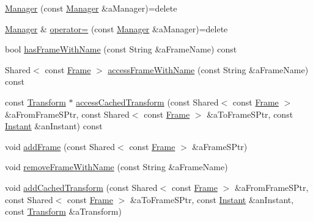 \begin{DoxyCompactItemize}
\item 
\hyperlink{classostk_1_1physics_1_1coord_1_1frame_1_1_manager_af000e1deebf0cf7f08ffa54d0e2aa854}{Manager} (const \hyperlink{classostk_1_1physics_1_1coord_1_1frame_1_1_manager}{Manager} \&a\+Manager)=delete
\item 
\hyperlink{classostk_1_1physics_1_1coord_1_1frame_1_1_manager}{Manager} \& \hyperlink{classostk_1_1physics_1_1coord_1_1frame_1_1_manager_a6503baa568803e9943a6685865269b6f}{operator=} (const \hyperlink{classostk_1_1physics_1_1coord_1_1frame_1_1_manager}{Manager} \&a\+Manager)=delete
\item 
bool \hyperlink{classostk_1_1physics_1_1coord_1_1frame_1_1_manager_ac353df7eaa41ec705c7728afef0aff34}{has\+Frame\+With\+Name} (const String \&a\+Frame\+Name) const
\item 
Shared$<$ const \hyperlink{classostk_1_1physics_1_1coord_1_1_frame}{Frame} $>$ \hyperlink{classostk_1_1physics_1_1coord_1_1frame_1_1_manager_abe8ac950d9f04b01a7c1165a6acb2a65}{access\+Frame\+With\+Name} (const String \&a\+Frame\+Name) const
\item 
const \hyperlink{classostk_1_1physics_1_1coord_1_1_transform}{Transform} $\ast$ \hyperlink{classostk_1_1physics_1_1coord_1_1frame_1_1_manager_a241b2aea6a86ba5a0ec50a0bf91b4427}{access\+Cached\+Transform} (const Shared$<$ const \hyperlink{classostk_1_1physics_1_1coord_1_1_frame}{Frame} $>$ \&a\+From\+Frame\+S\+Ptr, const Shared$<$ const \hyperlink{classostk_1_1physics_1_1coord_1_1_frame}{Frame} $>$ \&a\+To\+Frame\+S\+Ptr, const \hyperlink{classostk_1_1physics_1_1time_1_1_instant}{Instant} \&an\+Instant) const
\item 
void \hyperlink{classostk_1_1physics_1_1coord_1_1frame_1_1_manager_a75538bd860deefad7cce2347a6b96d97}{add\+Frame} (const Shared$<$ const \hyperlink{classostk_1_1physics_1_1coord_1_1_frame}{Frame} $>$ \&a\+Frame\+S\+Ptr)
\item 
void \hyperlink{classostk_1_1physics_1_1coord_1_1frame_1_1_manager_ada10a8a3ff3ced0182bbb2a42abbbb71}{remove\+Frame\+With\+Name} (const String \&a\+Frame\+Name)
\item 
void \hyperlink{classostk_1_1physics_1_1coord_1_1frame_1_1_manager_a0b6f34e9c38cc24982afc09b2b991c94}{add\+Cached\+Transform} (const Shared$<$ const \hyperlink{classostk_1_1physics_1_1coord_1_1_frame}{Frame} $>$ \&a\+From\+Frame\+S\+Ptr, const Shared$<$ const \hyperlink{classostk_1_1physics_1_1coord_1_1_frame}{Frame} $>$ \&a\+To\+Frame\+S\+Ptr, const \hyperlink{classostk_1_1physics_1_1time_1_1_instant}{Instant} \&an\+Instant, const \hyperlink{classostk_1_1physics_1_1coord_1_1_transform}{Transform} \&a\+Transform)
\end{DoxyCompactItemize}
